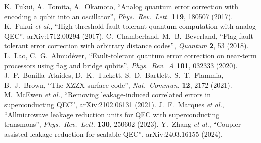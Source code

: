 \documentclass[11pt]{article}
\begin{document}
\begin{thebibliography}{99}
K.~Fukui, A.~Tomita, A.~Okamoto,
``Analog quantum error correction with encoding a qubit into an oscillator'',
\emph{Phys.\ Rev.\ Lett.} \textbf{119}, 180507 (2017).
K.~Fukui \emph{et al.},
``High-threshold fault-tolerant quantum computation with analog QEC'',
arXiv:1712.00294 (2017).
C.~Chamberland, M.~B.~Beverland,
``Flag fault-tolerant error correction with arbitrary distance codes'',
\emph{Quantum} \textbf{2}, 53 (2018).
L.~Lao, C.~G.~Almud\'ever,
``Fault-tolerant quantum error correction on near-term processors using flag and bridge qubits'',
\emph{Phys.\ Rev.\ A} \textbf{101}, 032333 (2020).
J.~P.~Bonilla~Ataides, D.~K.~Tuckett, S.~D.~Bartlett, S.~T.~Flammia, B.~J.~Brown,
``The XZZX surface code'',
\emph{Nat.\ Commun.} \textbf{12}, 2172 (2021).
M.~McEwen \emph{et al.}, ``Removing leakage-induced correlated errors in superconducting QEC'',
arXiv:2102.06131 (2021).
J.~F.~Marques \emph{et al.}, ``All\‑microwave leakage reduction units for QEC with superconducting transmons'',
\emph{Phys.\ Rev.\ Lett.} \textbf{130}, 250602 (2023).
Y.~Zhang \emph{et al.}, ``Coupler-assisted leakage reduction for scalable QEC'',
arXiv:2403.16155 (2024).
\end{thebibliography}
\end{document}
